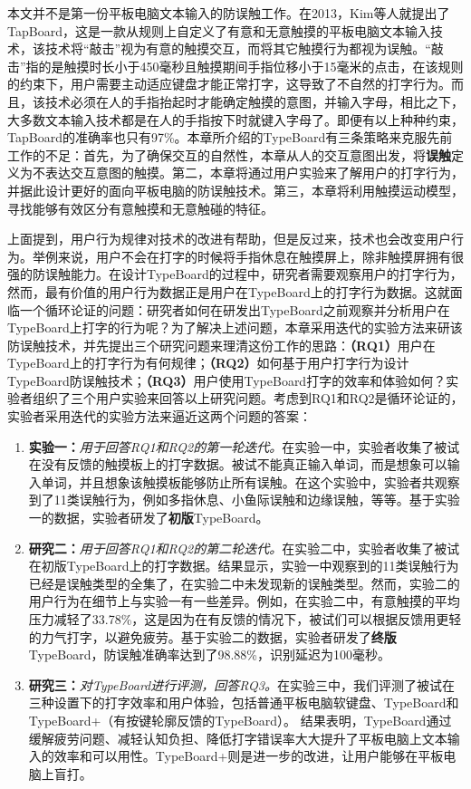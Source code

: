 本文并不是第一份平板电脑文本输入的防误触工作。在2013，Kim等人就提出了TapBoard\cite{2013-TapBoard}，这是一款从规则上自定义了有意和无意触摸的平板电脑文本输入技术，该技术将“敲击”视为有意的触摸交互，而将其它触摸行为都视为误触。“敲击”指的是触摸时长小于450毫秒且触摸期间手指位移小于15毫米的点击，在该规则的约束下，用户需要主动适应键盘才能正常打字，这导致了不自然的打字行为。而且，该技术必须在人的手指抬起时才能确定触摸的意图，并输入字母，相比之下，大多数文本输入技术都是在人的手指按下时就键入字母了。即便有以上种种约束，TapBoard的准确率也只有97\%。本章所介绍的TypeBoard有三条策略来克服先前工作的不足：首先，为了确保交互的自然性，本章从人的交互意图出发，将\textbf{误触}定义为不表达交互意图的触摸。第二，本章将通过用户实验来了解用户的打字行为，并据此设计更好的面向平板电脑的防误触技术。第三，本章将利用触摸运动模型，寻找能够有效区分有意触摸和无意触碰的特征。

上面提到，用户行为规律对技术的改进有帮助，但是反过来，技术也会改变用户行为。举例来说，用户不会在打字的时候将手指休息在触摸屏上，除非触摸屏拥有很强的防误触能力。在设计TypeBoard的过程中，研究者需要观察用户的打字行为，然而，最有价值的用户行为数据正是用户在TypeBoard上的打字行为数据。这就面临一个循环论证的问题：研究者如何在研发出TypeBoard之前观察并分析用户在TypeBoard上打字的行为呢？为了解决上述问题，本章采用迭代的实验方法来研该防误触技术，并先提出三个研究问题来理清这份工作的思路：\textbf{（RQ1）}用户在TypeBoard上的打字行为有何规律；\textbf{（RQ2）}如何基于用户打字行为设计TypeBoard防误触技术；\textbf{（RQ3）}用户使用TypeBoard打字的效率和体验如何？实验者组织了三个用户实验来回答以上研究问题。考虑到RQ1和RQ2是循环论证的，实验者采用迭代的实验方法来逼近这两个问题的答案：

\begin{enumerate}
	\item{\textbf{实验一：}\emph{用于回答RQ1和RQ2的第一轮迭代。}在实验一中，实验者收集了被试在没有反馈的触摸板上的打字数据。被试不能真正输入单词，而是想象可以输入单词，并且想象该触摸板能够防止所有误触。在这个实验中，实验者共观察到了11类误触行为，例如多指休息、小鱼际误触和边缘误触，等等。基于实验一的数据，实验者研发了\textbf{初版}TypeBoard。}
	\item{\textbf{研究二：}\emph{用于回答RQ1和RQ2的第二轮迭代。}在实验二中，实验者收集了被试在初版TypeBoard上的打字数据。结果显示，实验一中观察到的11类误触行为已经是误触类型的全集了，在实验二中未发现新的误触类型。然而，实验二的用户行为在细节上与实验一有一些差异。例如，在实验二中，有意触摸的平均压力减轻了33.78\%，这是因为在有反馈的情况下，被试们可以根据反馈用更轻的力气打字，以避免疲劳。基于实验二的数据，实验者研发了\textbf{终版}TypeBoard，防误触准确率达到了98.88\%，识别延迟为100毫秒。}
	\item{\textbf{研究三：}\emph{对TypeBoard进行评测，回答RQ3。}在实验三中，我们评测了被试在三种设置下的打字效率和用户体验，包括普通平板电脑软键盘、TypeBoard和TypeBoard+（有按键轮廓反馈的TypeBoard）。 结果表明，TypeBoard通过缓解疲劳问题、减轻认知负担、降低打字错误率大大提升了平板电脑上文本输入的效率和可以用性。TypeBoard+则是进一步的改进，让用户能够在平板电脑上盲打。}
\end{enumerate}

